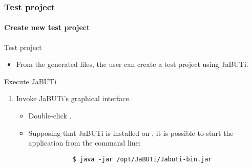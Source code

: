 \begin{frame}[parent={cmap:jabuti-test-project},hasnext=true,hasprev=true,fragile]
\frametitle{Test project}
\framesubtitle{Create new test project}
\label{procedure:create-test-project}

\begin{block:fact}{Test project}
\begin{itemize}
	\item From the generated  files, the user can create a
	test project using JaBUTi.
\end{itemize}
\end{block:fact}

\begin{block:procedure}{Execute JaBUTi}
\begin{enumerate}
	\item Invoke JaBUTi's graphical interface.
	\begin{itemize}
		\item Double-click .

		\item Supposing that JaBUTi is installed on ,
		it is possible to start the application from the command line:
		\begin{lstlisting}
			$ java -jar /opt/JaBUTi/Jabuti-bin.jar
		\end{lstlisting}
	\end{itemize}
\end{enumerate}
\end{block:procedure}
\end{frame}



